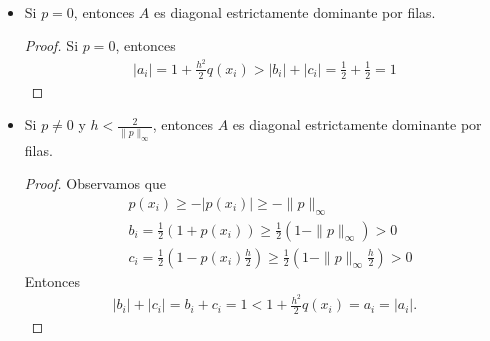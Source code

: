 \begin{ejemplo} \
\begin{itemize}
    \item Si $p = 0$, entonces $A$ es diagonal estrictamente dominante por filas. \begin{proof}
    Si $p = 0$, entonces
    \begin{align*}
        |a_i| = 1 + \frac{h^2}{2}q(x_i) > |b_i| + |c_i| = \frac{1}{2} + \frac{1}{2} = 1
    \end{align*}
    \end{proof}
    \item Si $p \not = 0$ y $h < \frac{2}{\|p\|_{\infty}}$, entonces $A$ es diagonal estrictamente dominante por filas.
    \begin{proof}
    Observamos que
    \begin{align*}
        & p(x_i) \ge -|p(x_i)| \ge - \|p\|_{\infty} \\
        & b_i = \frac{1}{2} \left(1 + p(x_i) \right) \ge \frac{1}{2} \left(1 - \|p\|_{\infty} \right) > 0 \\
        &c_i = \frac{1}{2} \left(1- p(x_i) \frac{h}{2} \right) \ge \frac{1}{2} \left(1 - \|p\|_{\infty}\frac{h}{2} \right) > 0
    \end{align*}
    Entonces
    \begin{align*}
        |b_i| + |c_i| = b_i + c_i = 1 < 1 + \frac{h^2}{2}q(x_i) = a_i = |a_i|.
    \end{align*}
    \end{proof}
\end{itemize}
\end{ejemplo}


